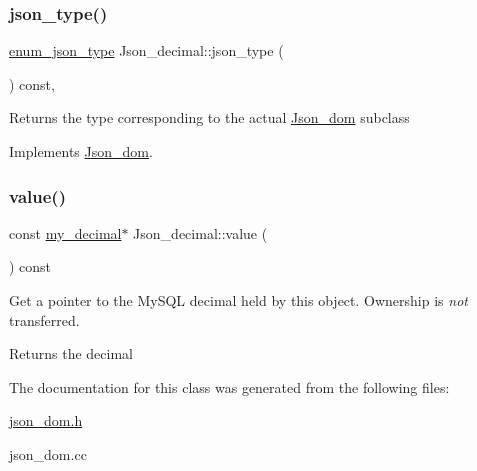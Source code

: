 \subsubsection{\texorpdfstring{json\+\_\+type()}{json\_type()}}
{\footnotesize\ttfamily \mbox{\hyperlink{classJson__dom_af37eed7dfe1da1d6507d3ab85320eb03}{enum\+\_\+json\+\_\+type}} Json\+\_\+decimal\+::json\+\_\+type (\begin{DoxyParamCaption}{ }\end{DoxyParamCaption}) const\hspace{0.3cm}{\ttfamily [inline]}, {\ttfamily [virtual]}}

\begin{DoxyReturn}{Returns}
the type corresponding to the actual \mbox{\hyperlink{classJson__dom}{Json\+\_\+dom}} subclass 
\end{DoxyReturn}


Implements \mbox{\hyperlink{classJson__dom_aed953eca1e112aade66511ad1bbf82b8}{Json\+\_\+dom}}.

\mbox{\label{classJson__decimal_ab5a0c36eb896377174cb30939b8802e4}} 
\subsubsection{\texorpdfstring{value()}{value()}}
{\footnotesize\ttfamily const \mbox{\hyperlink{classmy__decimal}{my\+\_\+decimal}}$\ast$ Json\+\_\+decimal\+::value (\begin{DoxyParamCaption}{ }\end{DoxyParamCaption}) const\hspace{0.3cm}{\ttfamily [inline]}}

Get a pointer to the My\+S\+QL decimal held by this object. Ownership is {\itshape not} transferred. \begin{DoxyReturn}{Returns}
the decimal 
\end{DoxyReturn}


The documentation for this class was generated from the following files\+:\begin{DoxyCompactItemize}
\item 
\mbox{\hyperlink{json__dom_8h}{json\+\_\+dom.\+h}}\item 
json\+\_\+dom.\+cc\end{DoxyCompactItemize}
